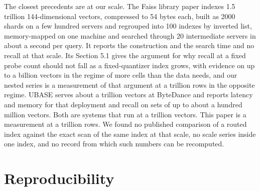 \documentclass[sigconf, nonacm]{acmart}
\begin{document}
The closest precedents are at our scale. The Faiss library paper \cite{douze2024faiss} indexes 1.5
trillion 144-dimensional vectors, compressed to 54 bytes each, built as 2000 shards on a few hundred
servers and regrouped into 100 indexes by inverted list, memory-mapped on one machine and searched
through 20 intermediate servers in about a second per query. It reports the construction and the
search time and no recall at that scale. Its Section 5.1 gives the argument for why recall at a
fixed probe count should not fall as a fixed-quantizer index grows, with evidence on up to a billion
vectors in the regime of more cells than the data needs, and our nested series is a measurement of
that argument at a trillion rows in the opposite regime. UBASE \cite{tian2026ubase} serves about a trillion vectors
at ByteDance and reports latency and memory for that deployment and recall on sets of up to about a
hundred million vectors. Both are systems that run at a trillion vectors. This paper is a
measurement at a trillion rows. We found no published comparison of a routed index against the
exact scan of the same index at that scale, no scale series inside one index, and no record from
which such numbers can be recomputed.

\section{Reproducibility}
\label{sec:repro}
\end{document}
